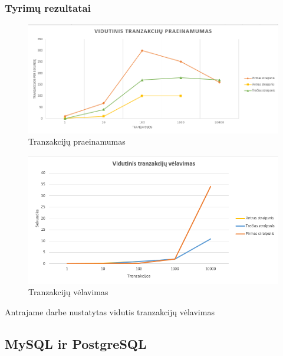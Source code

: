 \documentclass{VUMIFPSkursinis}
\begin{document}
		\subsubsection{Tyrimų rezultatai}
\begin{figure}[H]
    \centering
    \includegraphics[scale=0.5]{img/Praein}
    \caption{Tranzakcijų praeinamumas}   %
    \label{img:mlp}
\end{figure}		
\begin{figure}[H]
    \centering
    \includegraphics[scale=0.5]{img/Velav}
    \caption{Tranzakcijų vėlavimas}   %
    \label{img:mlp}
\end{figure}		





					Antrajame darbe \cite{ThailandPerf} nustatytas vidutis tranzakcijų vėlavimas 
					
									


			

	\subsection{MySQL ir PostgreSQL}
\end{document}
